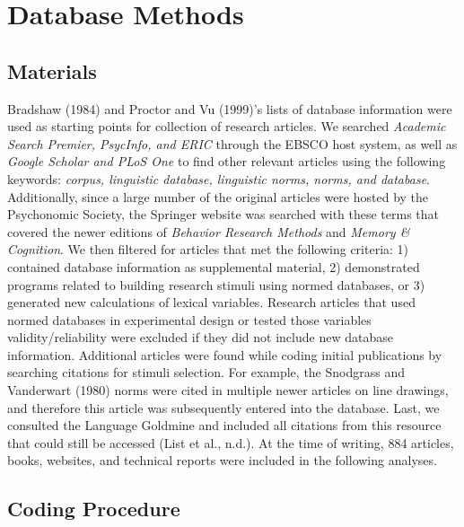 \documentclass[english,,man]{apa6}
\theoremstyle{definition}
\theoremstyle{definition}
\theoremstyle{definition}
\theoremstyle{remark}
\begin{document}
\hypertarget{database-methods}{%
\section{Database Methods}\label{database-methods}}

\hypertarget{materials}{%
\subsection{Materials}\label{materials}}

Bradshaw (1984) and Proctor and Vu (1999)'s lists of database
information were used as starting points for collection of research
articles. We searched \emph{Academic Search Premier, PsycInfo, and ERIC}
through the EBSCO host system, as well as \emph{Google Scholar and PLoS
One} to find other relevant articles using the following keywords:
\emph{corpus, linguistic database, linguistic norms, norms, and
database}. Additionally, since a large number of the original articles
were hosted by the Psychonomic Society, the Springer website was
searched with these terms that covered the newer editions of
\emph{Behavior Research Methods} and \emph{Memory \& Cognition}. We then
filtered for articles that met the following criteria: 1) contained
database information as supplemental material, 2) demonstrated programs
related to building research stimuli using normed databases, or 3)
generated new calculations of lexical variables. Research articles that
used normed databases in experimental design or tested those variables
validity/reliability were excluded if they did not include new database
information. Additional articles were found while coding initial
publications by searching citations for stimuli selection. For example,
the Snodgrass and Vanderwart (1980) norms were cited in multiple newer
articles on line drawings, and therefore this article was subsequently
entered into the database. Last, we consulted the Language Goldmine and
included all citations from this resource that could still be accessed
(List et al., n.d.). At the time of writing, 884 articles, books,
websites, and technical reports were included in the following analyses.

\hypertarget{coding-procedure}{%
\subsection{Coding Procedure}\label{coding-procedure}}
\end{document}

